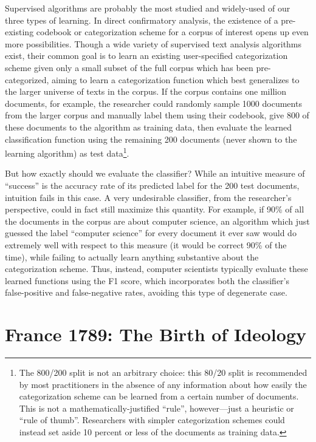 Supervised algorithms are probably the most studied and widely-used of our three types of learning. In direct confirmatory analysis, the existence of a pre-existing codebook or categorization scheme for a corpus of interest opens up even more possibilities. Though a wide variety of supervised text analysis algorithms exist, their common goal is to learn an existing user-specified categorization scheme given only a small subset of the full corpus which has been pre-categorized, aiming to learn a categorization function which best generalizes to the larger universe of texts in the corpus. If the corpus contains one million documents, for example, the researcher could randomly sample 1000 documents from the larger corpus and manually label them using their codebook, give 800 of these documents to the algorithm as training data, then evaluate the learned classification function using the remaining 200 documents (never shown to the learning algorithm) as test data\footnote{The 800/200 split is not an arbitrary choice: this 80/20 split is recommended by most practitioners in the absence of any information about how easily the categorization scheme can be learned from a certain number of documents. This is not a mathematically-justified ``rule'', however—just a heuristic or ``rule of thumb''. Researchers with simpler categorization schemes could instead set aside 10 percent or less of the documents as training data.}.

But how exactly should we evaluate the classifier? While an intuitive measure of ``success'' is the accuracy rate of its predicted label for the 200 test documents, intuition fails in this case. A very undesirable classifier, from the researcher's perspective, could in fact still maximize this quantity. For example, if 90\% of all the documents in the corpus are about computer science, an algorithm which just guessed the label ``computer science'' for every document it ever saw would do extremely well with respect to this measure (it would be correct 90\% of the time), while failing to actually learn anything substantive about the categorization scheme. Thus, instead, computer scientists typically evaluate these learned functions using the F1 score, which incorporates both the classifier's false-positive and false-negative rates, avoiding this type of degenerate case.

\section{France 1789: The Birth of Ideology}

